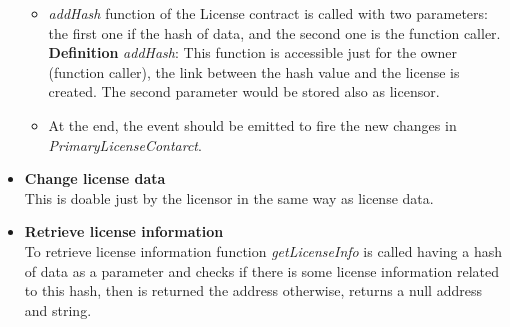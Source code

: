 \begin{itemize}
\begin{itemize}
		\item \textit{addHash} function of the License contract is called with two parameters: the first one if the hash of data, and the second one is the function caller.\\
		\hspace{1cm} \textbf{Definition} \textit{addHash}: This function is accessible just for the owner (function caller), the link between the hash value and the license is created. The second parameter would be stored also as licensor. \\
		\item At the end, the event should be emitted to fire the new changes in \textit{PrimaryLicenseContarct}.
		
	\end{itemize}
	\item \textbf{Change license data} \\
	This is doable just by the licensor in the same way as license data.  \\
	\item \textbf{Retrieve license information} \\
	To retrieve license information function \textit{getLicenseInfo} is called having a hash of data as a parameter and checks if there is some license information related to this hash, then is returned the address otherwise, returns a null address and string.
	
\end{itemize}
